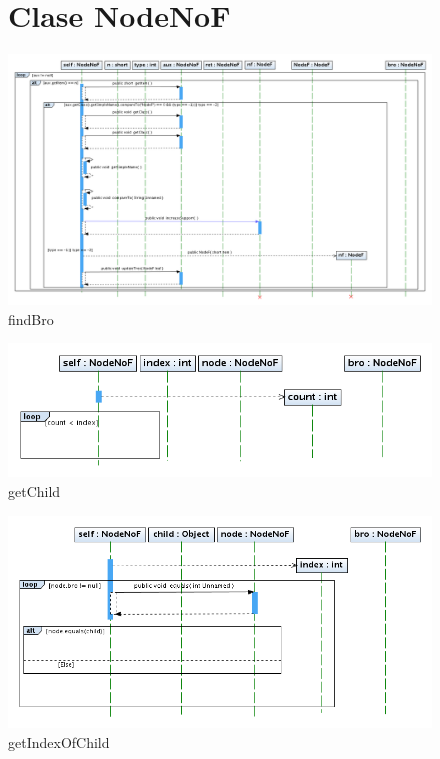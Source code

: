 \begin{figure}
\section{Clase NodeNoF}
\centering
\includegraphics[angle=90, width=1\textwidth]{NodeNoF/findBro.png}
\caption{findBro}
\end{figure}
\newpage

\begin{figure}
\centering
\includegraphics[width=1\textwidth]{NodeNoF/getChild.png}
\caption{getChild}
\end{figure}
\newpage

\begin{figure}
\centering
\includegraphics[width=1\textwidth]{NodeNoF/getIndexOfChild.png}
\caption{getIndexOfChild}
\end{figure}
\newpage
% 
% 
